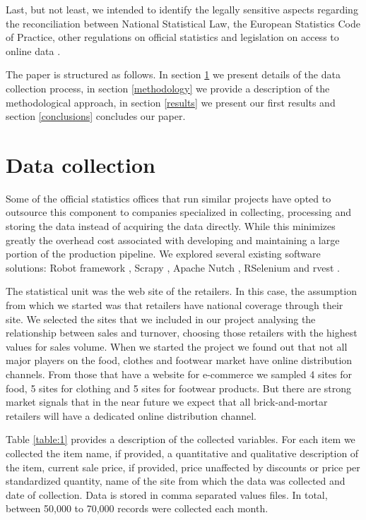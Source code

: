 \documentclass[]{article}
\begin{document}
Last, but not least, we intended to identify the legally sensitive aspects regarding the reconciliation between National Statistical Law, the European Statistics Code of Practice, other regulations on official statistics and legislation on access to online data \cite{swier}.

The paper is structured as follows. In section \ref{section2} we present details of the data collection process, in section \ref{methodology} we provide a description of the methodological approach, in section \ref{results} we present our first results and section \ref{conclusions} concludes our paper.


\section{Data collection}\label{section2}
 
Some of the official statistics offices that run similar projects have opted to outsource this component to companies specialized 
in collecting, processing and storing the data instead of acquiring the data directly. While this minimizes greatly the overhead 
cost associated with developing and maintaining a large portion of the production pipeline. We explored several existing software solutions: 
Robot framework \cite{robot2018}, Scrapy \cite{scrapy1, scrapy2}, Apache Nutch \cite{nutch}, RSelenium \cite{rs1} and rvest \cite{rvest}. 

The statistical unit was the web site of the retailers. In this case, the assumption from which we started was 
that retailers have national coverage through their site. We selected the sites that we included in our project analysing 
the relationship between sales and turnover, choosing those retailers with the highest values for sales volume. 
When we started the project we found out that not all major players on the food, clothes and footwear market have
online distribution channels. From those that have a website for e-commerce we sampled 4 sites for food, 
5 sites for clothing and 5 sites for footwear products. But there are strong market signals that in the near future 
we expect that all brick-and-mortar retailers will have a dedicated online distribution channel.

Table \ref{table:1} provides a description of the collected variables. For each item we collected the item name, if provided, 
a quantitative and qualitative description of the item, current sale price, if provided, price unaffected by discounts or 
price per standardized quantity, name of the site from which the data was collected and date of collection. Data is stored 
in comma separated values files. In total, between 50,000 to 70,000 records were collected each month.
\end{document}
